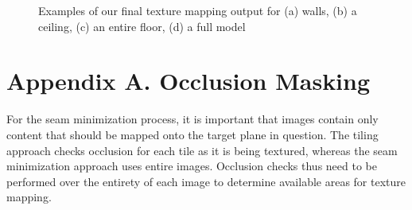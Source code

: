 \documentclass[10pt,twocolumn,letterpaper]{article}
\begin{document}
\begin{figure}
  \centering

  \centering {}

  \centering

  \centering {}
  \caption{Examples of our final texture mapping output for (a) walls,
    (b) a ceiling, (c) an entire floor, (d) a full model}
  \label{fig:results}
\end{figure}

{\small   }

\appendix
\section*{Appendix A. Occlusion Masking}
\label{sec:occlusionMasking}
For the seam minimization process, it is important that images contain
only content that should be mapped onto the target plane in
question. The tiling approach checks occlusion for each tile as it is
being textured, whereas the seam minimization approach uses entire
images.  Occlusion checks thus need to be performed over the entirety
of each image to determine available areas for texture mapping.
\end{document}
